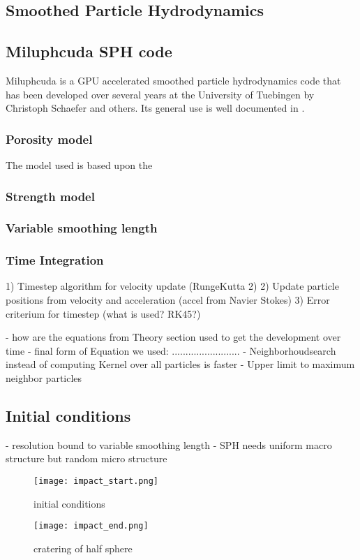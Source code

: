 \subsection{Smoothed Particle Hydrodynamics}


\subsection{Miluphcuda SPH code}
Miluphcuda is a GPU accelerated smoothed particle hydrodynamics code that has been developed over several years at the University of Tuebingen by Christoph Schaefer and others. Its general use is well documented in \cite{Schaefer_2016}.

\subsubsection{Porosity model}
The model used is based upon the
\subsubsection{Strength model}

\subsubsection{Variable smoothing length
}


\subsubsection{Time Integration}
1) Timestep algorithm for velocity update (RungeKutta 2)
2) Update particle positions from velocity and acceleration (accel from Navier Stokes)
3) Error criterium for timestep (what is used? RK45?)

- how are the equations from Theory section used to get the development over time
- final form of Equation we used:
.........................
- Neighborhoudsearch instead of computing Kernel over all particles is faster
- Upper limit to maximum neighbor particles

\subsection{Initial conditions}
- resolution bound to variable smoothing length
- SPH needs uniform macro structure but random micro structure


\begin{figure}
    \centering
    \texttt{[image: impact\_start.png]}
    \caption{initial conditions}
    \label{fig:impact_start}
\end{figure}

\begin{figure}
    \centering
    \texttt{[image: impact\_end.png]}
    \caption{cratering of half sphere}
    \label{fig:impact_end}
\end{figure}





